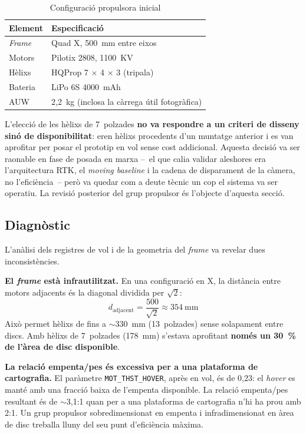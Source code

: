 \begin{table}[H]
    \centering
    \caption{Configuració propulsora inicial}
    \label{tab:propulsor-inicial}
    \begin{tabular}{ll}
        \toprule
        Element & Especificació \\
        \midrule
        \emph{Frame} & Quad X, 500~mm entre eixos \\
        Motors & Pilotix 2808, 1100~KV \\
        Hèlixs & HQProp 7 $\times$ 4 $\times$ 3 (tripala) \\
        Bateria & LiPo 6S 4000~mAh \\
        AUW & 2,2~kg (inclosa la càrrega útil fotogràfica) \\
        \bottomrule
    \end{tabular}
\end{table}

L'elecció de les hèlixs de 7~polzades \textbf{no va respondre a un criteri de disseny sinó de disponibilitat}: eren hèlixs procedents d'un muntatge anterior i es van aprofitar per posar el prototip en vol sense cost addicional. Aquesta decisió va ser raonable en fase de posada en marxa --~el que calia validar aleshores era l'arquitectura RTK, el \emph{moving baseline} i la cadena de disparament de la càmera, no l'eficiència~-- però va quedar com a deute tècnic un cop el sistema va ser operatiu. La revisió posterior del grup propulsor és l'objecte d'aquesta secció.

\subsection{Diagnòstic}
\label{subsec:propulsor-diagnostic}

L'anàlisi dels registres de vol i de la geometria del \emph{frame} va revelar dues inconsistències.

\textbf{El \emph{frame} està infrautilitzat.} En una configuració en X, la distància entre motors adjacents és la diagonal dividida per $\sqrt{2}$:
\[
d_{\text{adjacent}} = \frac{500}{\sqrt{2}} \approx 354~\text{mm}
\]
Això permet hèlixs de fins a $\sim$330~mm (13~polzades) sense solapament entre discs. Amb hèlixs de 7~polzades (178~mm) s'estava aprofitant \textbf{només un 30~\% de l'àrea de disc disponible}.

\textbf{La relació empenta/pes és excessiva per a una plataforma de cartografia.} El paràmetre \texttt{MOT\_THST\_HOVER}, après en vol, és de 0,23: el \emph{hover} es manté amb una fracció baixa de l'empenta disponible. La relació empenta/pes resultant és de $\sim$3,1:1 quan per a una plataforma de cartografia n'hi ha prou amb 2:1. Un grup propulsor sobredimensionat en empenta i infradimensionat en àrea de disc treballa lluny del seu punt d'eficiència màxima.


